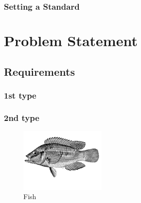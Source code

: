 \documentclass[12pt]{article} %
\begin{document}
\begin{flushleft}

\subsubsection{Setting a Standard} %

\lipsum[4] %


\section{Problem Statement} %

\lipsum[5] %


\subsection{Requirements} %

\subsubsection{1st type} %

\lipsum[6] %


\subsubsection{2nd type} %

\lipsum[6] %
\begin{figure} %
  \begin{center}
    \includegraphics[width=0.38\textwidth]{fish}
  \end{center}
  \caption{Fish}
\end{figure}
\lipsum[7-8] %


\end{flushleft}
\end{document}

